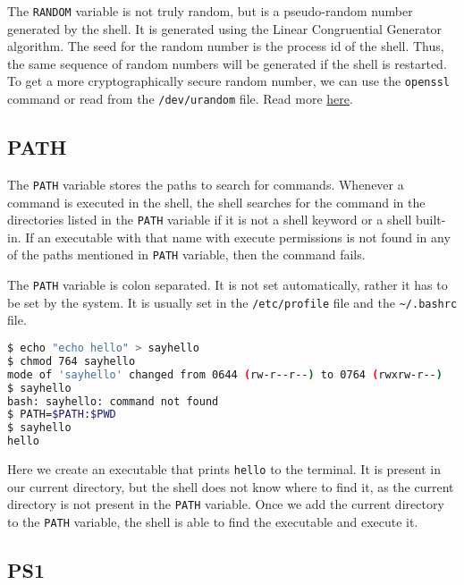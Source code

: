 \begin{remark}
  The \lstinline{RANDOM} variable is not truly random, but is a pseudo-random number generated by the shell.
  It is generated using the Linear Congruential Generator algorithm.
  The seed for the random number is the process id of the shell.
  Thus, the same sequence of random numbers will be generated if the shell is restarted.
  To get a more cryptographically secure random number, we can use the \lstinline{openssl} command or read from the \lstinline|/dev/urandom| file.
  Read more
  \href{https://ioflood.com/blog/bash-random-number/}{here}.
\end{remark}

\subsection{PATH}

The \lstinline{PATH} variable stores the paths to search for commands.
Whenever a command is executed in the shell, the shell searches for the command in the directories listed in the \lstinline{PATH} variable if it is not a shell keyword or a shell built-in. If an executable with that name with execute permissions is not found in any of the paths mentioned in \lstinline|PATH| variable, then the command fails.

The \lstinline{PATH} variable is colon separated. It is not set automatically, rather it has to be set by the system.
It is usually set in the \lstinline|/etc/profile| file and the \lstinline|~/.bashrc| file.

\begin{lstlisting}[language=bash]
$ echo "echo hello" > sayhello
$ chmod 764 sayhello
mode of 'sayhello' changed from 0644 (rw-r--r--) to 0764 (rwxrw-r--)
$ sayhello
bash: sayhello: command not found
$ PATH=$PATH:$PWD
$ sayhello
hello
\end{lstlisting}

Here we create an executable that prints \lstinline{hello} to the terminal.
It is present in our current directory, but the shell does not know where to find it, as the current directory is not present in the \lstinline|PATH| variable.
Once we add the current directory to the \lstinline|PATH| variable, the shell is able to find the executable and execute it.

\subsection{PS1}


